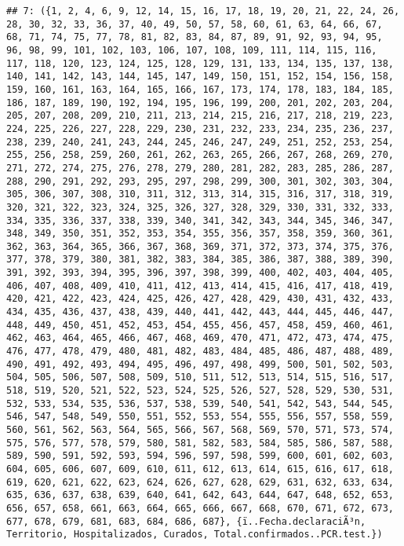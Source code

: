 \documentclass[
]{book}
\begin{document}
\begin{verbatim}
## 7: ({1, 2, 4, 6, 9, 12, 14, 15, 16, 17, 18, 19, 20, 21, 22, 24, 26, 28, 30, 32, 33, 36, 37, 40, 49, 50, 57, 58, 60, 61, 63, 64, 66, 67, 68, 71, 74, 75, 77, 78, 81, 82, 83, 84, 87, 89, 91, 92, 93, 94, 95, 96, 98, 99, 101, 102, 103, 106, 107, 108, 109, 111, 114, 115, 116, 117, 118, 120, 123, 124, 125, 128, 129, 131, 133, 134, 135, 137, 138, 140, 141, 142, 143, 144, 145, 147, 149, 150, 151, 152, 154, 156, 158, 159, 160, 161, 163, 164, 165, 166, 167, 173, 174, 178, 183, 184, 185, 186, 187, 189, 190, 192, 194, 195, 196, 199, 200, 201, 202, 203, 204, 205, 207, 208, 209, 210, 211, 213, 214, 215, 216, 217, 218, 219, 223, 224, 225, 226, 227, 228, 229, 230, 231, 232, 233, 234, 235, 236, 237, 238, 239, 240, 241, 243, 244, 245, 246, 247, 249, 251, 252, 253, 254, 255, 256, 258, 259, 260, 261, 262, 263, 265, 266, 267, 268, 269, 270, 271, 272, 274, 275, 276, 278, 279, 280, 281, 282, 283, 285, 286, 287, 288, 290, 291, 292, 293, 295, 297, 298, 299, 300, 301, 302, 303, 304, 305, 306, 307, 308, 310, 311, 312, 313, 314, 315, 316, 317, 318, 319, 320, 321, 322, 323, 324, 325, 326, 327, 328, 329, 330, 331, 332, 333, 334, 335, 336, 337, 338, 339, 340, 341, 342, 343, 344, 345, 346, 347, 348, 349, 350, 351, 352, 353, 354, 355, 356, 357, 358, 359, 360, 361, 362, 363, 364, 365, 366, 367, 368, 369, 371, 372, 373, 374, 375, 376, 377, 378, 379, 380, 381, 382, 383, 384, 385, 386, 387, 388, 389, 390, 391, 392, 393, 394, 395, 396, 397, 398, 399, 400, 402, 403, 404, 405, 406, 407, 408, 409, 410, 411, 412, 413, 414, 415, 416, 417, 418, 419, 420, 421, 422, 423, 424, 425, 426, 427, 428, 429, 430, 431, 432, 433, 434, 435, 436, 437, 438, 439, 440, 441, 442, 443, 444, 445, 446, 447, 448, 449, 450, 451, 452, 453, 454, 455, 456, 457, 458, 459, 460, 461, 462, 463, 464, 465, 466, 467, 468, 469, 470, 471, 472, 473, 474, 475, 476, 477, 478, 479, 480, 481, 482, 483, 484, 485, 486, 487, 488, 489, 490, 491, 492, 493, 494, 495, 496, 497, 498, 499, 500, 501, 502, 503, 504, 505, 506, 507, 508, 509, 510, 511, 512, 513, 514, 515, 516, 517, 518, 519, 520, 521, 522, 523, 524, 525, 526, 527, 528, 529, 530, 531, 532, 533, 534, 535, 536, 537, 538, 539, 540, 541, 542, 543, 544, 545, 546, 547, 548, 549, 550, 551, 552, 553, 554, 555, 556, 557, 558, 559, 560, 561, 562, 563, 564, 565, 566, 567, 568, 569, 570, 571, 573, 574, 575, 576, 577, 578, 579, 580, 581, 582, 583, 584, 585, 586, 587, 588, 589, 590, 591, 592, 593, 594, 596, 597, 598, 599, 600, 601, 602, 603, 604, 605, 606, 607, 609, 610, 611, 612, 613, 614, 615, 616, 617, 618, 619, 620, 621, 622, 623, 624, 626, 627, 628, 629, 631, 632, 633, 634, 635, 636, 637, 638, 639, 640, 641, 642, 643, 644, 647, 648, 652, 653, 656, 657, 658, 661, 663, 664, 665, 666, 667, 668, 670, 671, 672, 673, 677, 678, 679, 681, 683, 684, 686, 687}, {ï..Fecha.declaraciÃ³n, Territorio, Hospitalizados, Curados, Total.confirmados..PCR.test.})

\end{verbatim}
\end{document}
